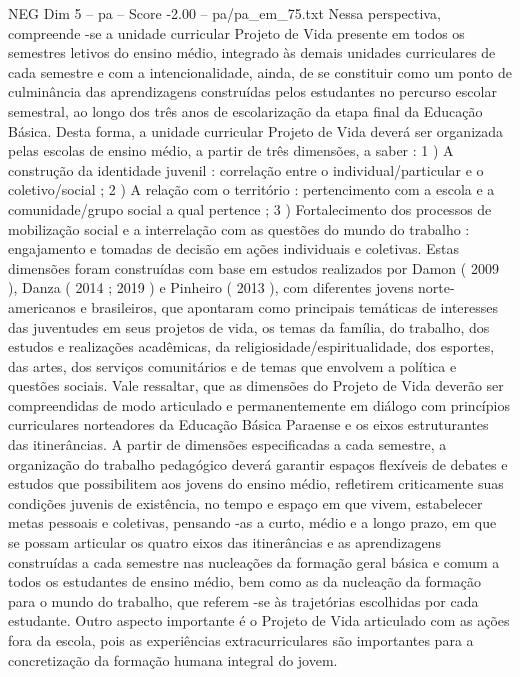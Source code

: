 \begin{textsample}{NEG Dim 5 – pa – Score -2.00 – pa/pa\_em\_75.txt}  \label{ex:f5_neg_042}
Nessa perspectiva, compreende -se a unidade curricular Projeto de Vida presente em todos os semestres letivos do ensino médio, integrado às demais unidades curriculares de cada semestre e com a intencionalidade, ainda, de se constituir como um ponto de culminância das aprendizagens construídas pelos estudantes no percurso escolar semestral, ao longo dos três anos de escolarização da etapa final da Educação Básica.
Desta forma, a unidade curricular Projeto de Vida deverá ser organizada pelas escolas de ensino médio, a partir de três dimensões, a saber : 1 ) A construção da identidade juvenil : correlação entre o individual/particular e o coletivo/social ; 2 ) A relação com o território : pertencimento com a escola e a comunidade/grupo social a qual pertence ; 3 ) Fortalecimento dos processos de mobilização social e a interrelação com as questões do mundo do trabalho : engajamento e tomadas de decisão em ações individuais e coletivas.
Estas dimensões foram construídas com base em estudos realizados por Damon ( 2009 ), Danza ( 2014 ; 2019 ) e Pinheiro ( 2013 ), com diferentes jovens norte-americanos e brasileiros, que apontaram como principais temáticas de interesses das juventudes em seus projetos de vida, os temas da família, do trabalho, dos estudos e realizações acadêmicas, da religiosidade/espiritualidade, dos esportes, das artes, dos serviços comunitários e de temas que envolvem a política e questões sociais.
Vale ressaltar, que as dimensões do Projeto de Vida deverão ser compreendidas de modo articulado e permanentemente em diálogo com princípios curriculares norteadores da Educação Básica Paraense e os eixos estruturantes das itinerâncias.
A partir de dimensões especificadas a cada semestre, a organização do trabalho pedagógico deverá garantir espaços flexíveis de debates e estudos que possibilitem aos jovens do ensino médio, refletirem criticamente suas condições juvenis de existência, no tempo e espaço em que vivem, estabelecer metas pessoais e coletivas, pensando -as a curto, médio e a longo prazo, em que se possam articular os quatro eixos das itinerâncias e as aprendizagens construídas a cada semestre nas nucleações da formação geral básica e comum a todos os estudantes de ensino médio, bem como as da nucleação da formação para o mundo do trabalho, que referem -se às trajetórias escolhidas por cada estudante.
Outro aspecto importante é o Projeto de Vida articulado com as ações fora da escola, pois as experiências extracurriculares são importantes para a concretização da formação humana integral do jovem.

\end{textsample}
